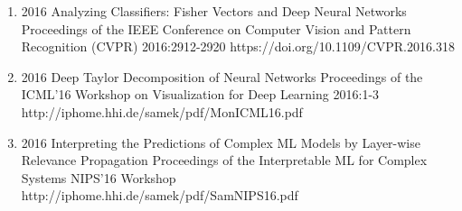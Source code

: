 \documentclass[10pt,a4paper]{article} %
\begin{document}
{\begin{enumerate}
        \item {}
                                {2016}
                                {Analyzing Classifiers: Fisher Vectors and Deep Neural Networks}
                                {Proceedings of the IEEE Conference on Computer Vision and Pattern Recognition (CVPR)}
                                {2016:2912-2920}
                                {https://doi.org/10.1109/CVPR.2016.318}

        \item {}
                                {2016}
                                {Deep Taylor Decomposition of Neural Networks}
                                {Proceedings of the ICML'16 Workshop on Visualization for Deep Learning}
                                {2016:1-3}
                                {http://iphome.hhi.de/samek/pdf/MonICML16.pdf}

        \item {}
                                {2016}
                                {Interpreting the Predictions of Complex ML Models by Layer-wise Relevance Propagation}
                                {Proceedings of the Interpretable ML for Complex Systems NIPS'16 Workshop}
                                {}
                                {http://iphome.hhi.de/samek/pdf/SamNIPS16.pdf}

    \end{enumerate}
}
\end{document}
